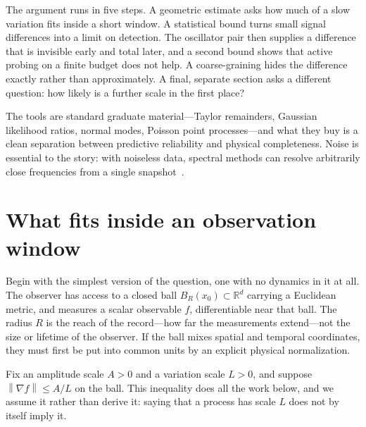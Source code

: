 \documentclass[10pt]{article}
\newcommand{\R}{\mathbb R}
\newcommand{\norm}[1]{\left\lVert#1\right\rVert}
\begin{document}
The argument runs in five steps. A geometric estimate asks how much of a slow
variation fits inside a short window. A statistical bound turns small signal
differences into a limit on detection. The oscillator pair then supplies a
difference that is invisible early and total later, and a second bound shows
that active probing on a finite budget does not help. A coarse-graining hides
the difference exactly rather than approximately. A final, separate section
asks a different question: how likely is a further scale in the first place?

The tools are standard graduate material---Taylor remainders, Gaussian
likelihood ratios, normal modes, Poisson point processes---and what they buy is
a clean separation between predictive reliability and physical completeness.
Noise is essential to the story: with noiseless data, spectral methods can
resolve arbitrarily close frequencies from a single snapshot~\cite{liao}.

\section*{What fits inside an observation window}
Begin with the simplest version of the question, one with no dynamics in it at
all. The observer has access to a closed ball $B_R(x_0)\subset\R^d$ carrying a
Euclidean metric, and measures a scalar observable $f$, differentiable near
that ball. The radius $R$ is the reach of the record---how far the measurements
extend---not the size or lifetime of the observer. If the ball mixes spatial and
temporal coordinates, they must first be put into common units by an explicit
physical normalization.

Fix an amplitude scale $A>0$ and a variation scale $L>0$, and suppose
$\norm{\nabla f}\leq A/L$ on the ball. This inequality does all the work below,
and we assume it rather than derive it: saying that a process has scale $L$
does not by itself imply it.
\end{document}
